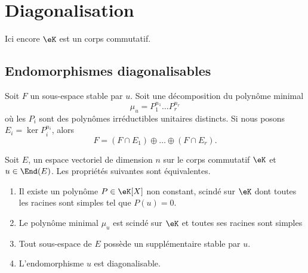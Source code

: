\section{Diagonalisation}

Ici encore \( \eK\) est un corps commutatif.

\subsection{Endomorphismes diagonalisables}

\begin{lemma}       \label{LemgnaEOk}
    Soit \( F\) un sous-espace stable par \( u\). Soit une décomposition du polynôme minimal
    \begin{equation}
        \mu_u=P_1^{n_1}\ldots P_r^{n_r}
    \end{equation}
    où les \( P_i\) sont des polynômes irréductibles unitaires distincts. Si nous posons \( E_i=\ker P_i^{n_i}\), alors
    \begin{equation}
        F=(F\cap E_1)\oplus\ldots \oplus(F\cap E_r).
    \end{equation}
\end{lemma}

\begin{theorem}     \label{ThoDigLEQEXR}
    Soit \( E\), un espace vectoriel de dimension \( n\) sur le corps commutatif \( \eK\) et \( u\in\End(E)\). Les propriétés suivantes sont équivalentes.
    \begin{enumerate}
        \item       \label{ItemThoDigLEQEXRi}
            Il existe un polynôme \( P\in\eK[X]\) non constant, scindé sur \(\eK\) dont toutes les racines sont simples tel que \( P(u)=0\).
        \item\label{ItemThoDigLEQEXRii}
            Le polynôme minimal \( \mu_u\) est scindé sur \(\eK\) et toutes ses racines sont simples
        \item\label{ItemThoDigLEQEXRiii}
            Tout sous-espace de \( E\) possède un supplémentaire stable par \( u\).
        \item\label{ItemThoDigLEQEXRiv}
            L'endomorphisme \( u\) est diagonalisable.
    \end{enumerate}

\end{theorem}

